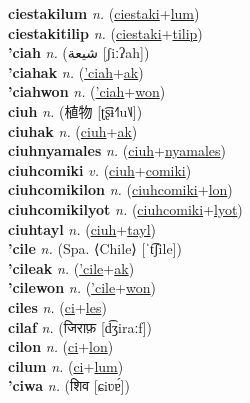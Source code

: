 \textbf{ciestakilum} \textit{n.} (\hyperref[ciestaki]{ciestaki}+\hyperref[lum]{lum})
 \label{ciestakilum} \\
\textbf{ciestakitilip} \textit{n.} (\hyperref[ciestaki]{ciestaki}+\hyperref[tilip]{tilip})
 \label{ciestakitilip} \\
\textbf{'ciah} \textit{n.} ({\arabics{}شيعة‎} [ʃiːʔah])
 \label{'ciah} \\
\textbf{'ciahak} \textit{n.} (\hyperref['ciah]{'ciah}+\hyperref[ak]{ak})
 \label{'ciahak} \\
\textbf{'ciahwon} \textit{n.} (\hyperref['ciah]{'ciah}+\hyperref[won]{won})
 \label{'ciahwon} \\
\textbf{ciuh} \textit{n.} ({\chinese{}植物} [ʈ͡ʂɨ˧˥u˥˩])
 \label{ciuh} \\
\textbf{ciuhak} \textit{n.} (\hyperref[ciuh]{ciuh}+\hyperref[ak]{ak})
 \label{ciuhak} \\
\textbf{ciuhnyamales} \textit{n.} (\hyperref[ciuh]{ciuh}+\hyperref[nyamales]{nyamales})
 \label{ciuhnyamales} \\
\textbf{ciuhcomiki} \textit{v.} (\hyperref[ciuh]{ciuh}+\hyperref[comiki]{comiki})
 \label{ciuhcomiki} \\
\textbf{ciuhcomikilon} \textit{n.} (\hyperref[ciuhcomiki]{ciuhcomiki}+\hyperref[lon]{lon})
 \label{ciuhcomikilon} \\
\textbf{ciuhcomikilyot} \textit{n.} (\hyperref[ciuhcomiki]{ciuhcomiki}+\hyperref[lyot]{lyot})
 \label{ciuhcomikilyot} \\
\textbf{ciuhtayl} \textit{n.} (\hyperref[ciuh]{ciuh}+\hyperref[tayl]{tayl})
 \label{ciuhtayl} \\
\textbf{'cile} \textit{n.} (Spa. ⟨Chile⟩ [ˈt͡ʃile])
 \label{'cile} \\
\textbf{'cileak} \textit{n.} (\hyperref['cile]{'cile}+\hyperref[ak]{ak})
 \label{'cileak} \\
\textbf{'cilewon} \textit{n.} (\hyperref['cile]{'cile}+\hyperref[won]{won})
 \label{'cilewon} \\
\textbf{ciles} \textit{n.} (\hyperref[ci]{ci}+\hyperref[les]{les})
 \label{ciles} \\
\textbf{cilaf} \textit{n.} ({\devanagari{}जिराफ़} [d͡ʒiraːf])
 \label{cilaf} \\
\textbf{cilon} \textit{n.} (\hyperref[ci]{ci}+\hyperref[lon]{lon})
 \label{cilon} \\
\textbf{cilum} \textit{n.} (\hyperref[ci]{ci}+\hyperref[lum]{lum})
 \label{cilum} \\
\textbf{'ciwa} \textit{n.} ({\devanagari{}शिव} [ɕiʋɐ́])
